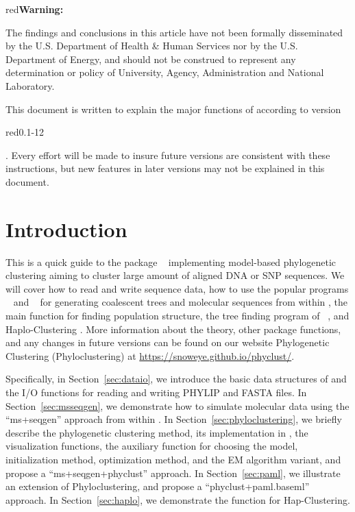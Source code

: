 
\begin{color}{red}\bf Warning:\end{color}
The findings and conclusions in this article have not been
formally disseminated by the U.S. Department of Health \& Human Services
nor by the U.S. Department of Energy,
and should not be construed to represent any determination or
policy of University, Agency, Administration and National Laboratory.

This document is written to explain the major functions of 
according to version \begin{color}{red}0.1-12\end{color}.
Every effort will be made to insure future versions are consistent with these
instructions, but new features in later versions may not be explained in this
document.


\section[Introduction]{Introduction}
\label{sec:introduction}

This is a quick guide to the package ~\citep{snoweye2011}
implementing model-based phylogenetic clustering aiming to cluster
large amount of aligned DNA or SNP sequences.
We will cover how to read and write sequence data,
how to use the popular programs ~\citep{Hudson2002} and ~\citep{Rambaut1997} for generating
coalescent trees and molecular sequences from within ,
the main function  for finding population structure,
the tree finding program  of ~\citep{Yang1997,Yang2007},
and Haplo-Clustering \citep{tzeng2005}.
More information about the theory, other package functions,
and any changes in future versions can be found on our website
Phylogenetic Clustering (Phyloclustering) at
\url{https://snoweye.github.io/phyclust/}.

Specifically, in Section~\ref{sec:dataio}, we introduce the basic data structures
of  and the I/O functions for reading and writing 
PHYLIP and FASTA files. In Section~\ref{sec:msseqgen},
we demonstrate how to simulate molecular data using the ``ms+seqgen'' approach from within .
In Section~\ref{sec:phyloclustering}, we briefly describe
the phylogenetic clustering method, its implementation in , the visualization functions,
the auxiliary function  for choosing the model, initialization method, optimization method,
and the EM algorithm variant, and propose a ``ms+seqgen+phyclust'' approach.
In Section~\ref{sec:paml}, we illustrate an extension of Phyloclustering, and
propose a ``phyclust+paml.baseml'' approach.
In Section~\ref{sec:haplo}, we demonstrate the function
 for Hap-Clustering.



